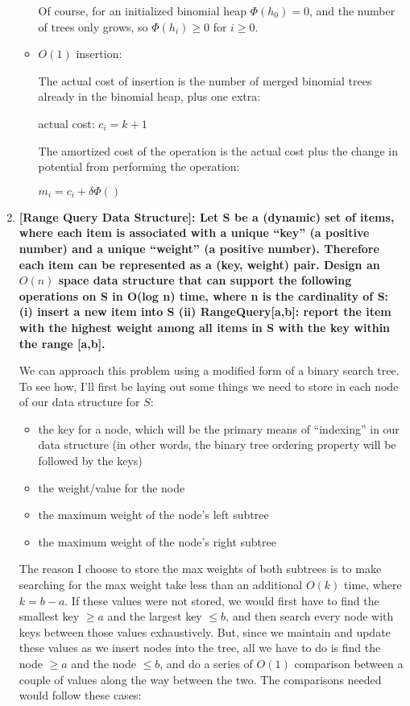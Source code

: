 \documentclass[12pt]{article}
\begin{document}
\begin{enumerate}
\begin{itemize}
        Of course, for an initialized binomial heap $\Phi(h_0) = 0$, and the number of trees only grows, so 
        $\Phi(h_i) \geq 0$ for $i \geq 0$.

        \item $O(1)$ insertion:
        
        The actual cost of insertion is the number of merged binomial trees already in the binomial heap, plus one 
        extra: 

        actual cost: $c_i = k + 1$

        The amortized cost of the operation is the actual cost plus the change in potential from performing the 
        operation:

        $m_i = c_i + \delta \Phi()$

    \end{itemize}

    \item \textbf{[Range Query Data Structure]: Let S be a (dynamic) set of items, where each item is 
    associated with a unique ``key'' (a positive number) and a unique ``weight'' (a positive 
    number). Therefore each item can be represented as a (key, weight) pair. Design an $O(n)$ 
    space data structure that can support the following operations on S in O(log n) time, where 
    n is the cardinality of S: (i) insert a new item into S (ii) RangeQuery[a,b]: report the 
    item with the highest weight among all items in S with the key within the range [a,b].}

    We can approach this problem using a modified form of a binary search tree. To see how, I'll first be laying out 
    some things we need to store in each node of our data structure for $S$:

    \begin{itemize}
        \item the key for a node, which will be the primary means of ``indexing'' in our data structure (in other words, 
        the binary tree ordering property will be followed by the keys)
        \item the weight/value for the node
        \item the maximum weight of the node's left subtree
        \item the maximum weight of the node's right subtree
    \end{itemize}

    The reason I choose to store the max weights of both subtrees is to make searching for the max weight 
    take less than an additional $O(k)$ time, where $k = b - a$. If these values were not stored, we would first 
    have to find the smallest key $\geq a$ and the largest key $\leq b$, and then search every node with keys 
    between those values exhaustively. But, since we maintain and update these values as we insert nodes into the 
    tree, all we have to do is find the node $\geq a$ and the node $\leq b$, and do a series of $O(1)$ comparison between 
    a couple of values along the way between the two. The comparisons needed would follow these cases:


\end{enumerate}
\end{document}
